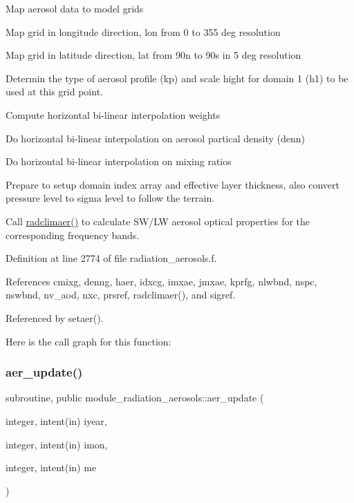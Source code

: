 \begin{DoxyEnumerate}
\item Map aerosol data to model grids
\begin{DoxyItemize}
\item Map grid in longitude direction, lon from 0 to 355 deg resolution
\item Map grid in latitude direction, lat from 90n to 90s in 5 deg resolution
\end{DoxyItemize}
\item Determin the type of aerosol profile (kp) and scale hight for domain 1 (h1) to be used at this grid point.
\item Compute horizontal bi-\/linear interpolation weights
\item Do horizontal bi-\/linear interpolation on aerosol partical density (denn)
\item Do horizontal bi-\/linear interpolation on mixing ratios
\item Prepare to setup domain index array and effective layer thickness, also convert pressure level to sigma level to follow the terrain.
\item Call \hyperlink{group__module__radiation__aerosols_gae60b55ebc37825b2c3c95f95b23ed558}{radclimaer()} to calculate S\+W/\+LW aerosol optical properties for the corresponding frequency bands. 
\end{DoxyEnumerate}

Definition at line 2774 of file radiation\+\_\+aerosols.\+f.



References cmixg, denng, haer, idxcg, imxae, jmxae, kprfg, nlwbnd, nspc, nswbnd, nv\+\_\+aod, nxc, prsref, radclimaer(), and sigref.



Referenced by setaer().

Here is the call graph for this function\+:
\mbox{\label{group__module__radiation__aerosols_ga237071d2a0691d5aae199937d9b6aca5}} 
\subsubsection{\texorpdfstring{aer\+\_\+update()}{aer\_update()}}
{\footnotesize\ttfamily subroutine, public module\+\_\+radiation\+\_\+aerosols\+::aer\+\_\+update (\begin{DoxyParamCaption}\item[{integer, intent(in)}]{iyear,  }\item[{integer, intent(in)}]{imon,  }\item[{integer, intent(in)}]{me }\end{DoxyParamCaption})}


